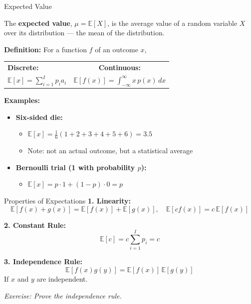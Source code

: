 \documentclass{beamer}
\begin{document}
\begin{frame}{Expected Value}

The \textbf{expected value}, $\mu = \mathbb{E}[X]$, is the average value of a random variable $X$ over its distribution --- the mean of the distribution.

\vspace{1em}
\textbf{Definition:} For a function $f$ of an outcome $x$,

\begin{center}
\begin{tabular}{lc}
\textbf{Discrete:} & \textbf{Continuous:} \\
$\displaystyle \mathbb{E}[x] = \sum_{i=1}^{I} p_i a_i$ &
$\displaystyle \mathbb{E}[f(x)] = \int_{-\infty}^{\infty} x \, p(x) \, dx$
\end{tabular}
\end{center}

\textbf{Examples:}
\begin{itemize}
\item \textbf{Six-sided die:}
  \begin{itemize}
  \item $\mathbb{E}[x] = \frac{1}{6}(1 + 2 + 3 + 4 + 5 + 6) = 3.5$
  \item Note: not an actual outcome, but a statistical average
  \end{itemize}
\item \textbf{Bernoulli trial (1 with probability $p$):}
  \begin{itemize}
  \item $\mathbb{E}[x] = p \cdot 1 + (1 - p) \cdot 0 = p$
  \end{itemize}
\end{itemize}

\end{frame}

\begin{frame}{Properties of Expectations}
\textbf{1. Linearity:}
\[
\mathbb{E}[f(x) + g(x)] = \mathbb{E}[f(x)] + \mathbb{E}[g(x)], \quad
\mathbb{E}[c f(x)] = c \, \mathbb{E}[f(x)]
\]

\textbf{2. Constant Rule:}
\[
\mathbb{E}[c] = c \sum_{i=1}^{I} p_i = c
\]

\textbf{3. Independence Rule:}
\[
\mathbb{E}[f(x) g(y)] = \mathbb{E}[f(x)] \, \mathbb{E}[g(y)]
\]
If $x$ and $y$ are independent.

\vspace{1em}
\textit{Exercise: Prove the independence rule.}
\end{frame}
\end{document}
